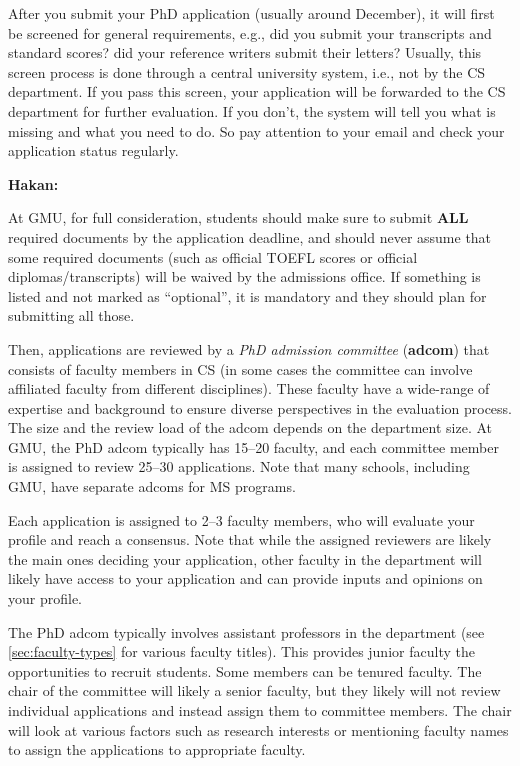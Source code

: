 \documentclass[oneside,11pt]{book}
\newenvironment{commentbox}[1][]{
  \small
  \begin{mybox}
    {\small \textbf{#1}}
  }{
  \end{mybox}
}
\begin{document}
After you submit your PhD application (usually around December), it will first be screened
for general requirements, e.g., did you submit your transcripts and standard scores? did your reference writers submit their letters? Usually, this screen process is done through a central university system, i.e., not by the CS department. If you pass this screen, your application will be forwarded to the CS department for further evaluation. If you don't,  the system will tell you what is missing and what you need to do. So pay attention to your email and check your application status regularly.

\begin{commentbox}[Hakan:]
  At GMU, for full consideration, students should make sure to submit \textbf{ALL} required documents by the application deadline, and should never assume that some required documents (such as official TOEFL scores or official diplomas/transcripts) will be waived by the admissions office. If something is listed and not marked as ``optional'', it is mandatory and they should plan for submitting all those.
\end{commentbox}

Then, applications are reviewed by a \emph{PhD admission committee} (\textbf{adcom}) that consists of faculty members in CS (in some cases the committee can involve affiliated faculty from different disciplines). These faculty have a wide-range of expertise and background to ensure diverse perspectives in the evaluation process. The size and the review load of the adcom depends on the department size. At GMU, the PhD adcom typically has 15--20 faculty, and each committee member is assigned to review 25--30 applications. Note that many schools, including GMU, have separate adcoms for MS programs.

Each application is assigned to 2--3 faculty members, who will evaluate your profile and reach a consensus.  Note that while the assigned reviewers are likely the main ones deciding your application, other faculty in the department will likely have access to your application and can provide inputs and opinions on your profile.

The PhD adcom typically involves assistant professors in the department (see \autoref{sec:faculty-types} for various faculty titles). This provides junior faculty the opportunities to recruit students. Some members can be tenured faculty. The chair of the committee will likely a senior faculty, but they likely will not review individual applications and instead assign them to committee members. The chair will look at various factors such as research interests or mentioning faculty names to assign the applications to appropriate faculty.
\end{document}
